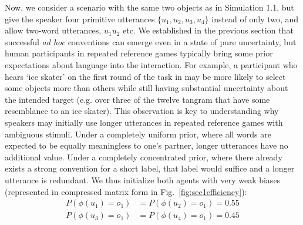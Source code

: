 Now, we consider a scenario with the same two objects as in Simulation 1.1, but give the speaker four primitive utterances $\{u_1, u_2, u_3, u_4\}$ instead of only two, and allow two-word utterances, $u_1u_2$ etc. 
We established in the previous section that successful \emph{ad hoc} conventions can emerge even in a state of pure uncertainty, but human participants in repeated reference games typically bring some prior expectations about language into the interaction.
For example, a participant who hears `ice skater' on the first round of the task in  may be more likely to select some objects more than others while still having substantial uncertainty about the intended target (e.g. over three of the twelve tangram that have some resemblance to an ice skater).
This observation is key to understanding why speakers may initially use longer utterances in repeated reference games with ambiguous stimuli. 
Under a completely uniform prior, where all words are expected to be equally meaningless to one's partner, longer utterances have no additional value. 
Under a completely concentrated prior, where there already exists a strong convention for a short label, that label would suffice and a longer utterance is redundant.
We thus initialize both agents with very weak biases (represented in compressed matrix form in Fig.~\ref{fig:sec1efficiency}):
\begin{align}
P(\phi(u_1) = o_1) & = P(\phi(u_2) = o_1)  = 0.55\nonumber\\
    P(\phi(u_3) = o_1) & = P(\phi(u_4) = o_1)  = 0.45\nonumber
\end{align}



